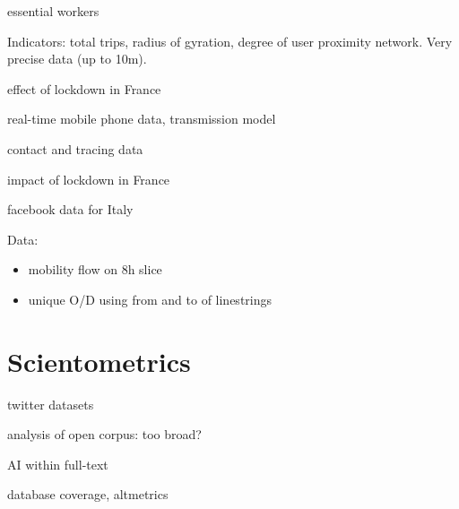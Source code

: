 \documentclass[10pt]{article}
\begin{document}
\cite{batty2020london} essential workers

	
\cite{Pepe2020.03.22.20039933} Indicators: total trips, radius of gyration, degree of user proximity network. Very precise data (up to 10m).

\cite{pullano2020population} effect of lockdown in France



\cite{jia2020population} real-time mobile phone data, transmission model

\cite{Zhangeabb8001} contact and tracing data


\cite{salje:pasteur-02548181} impact of lockdown in France


\cite{Bonaccorsi15530} facebook data for Italy
	
\cite{kissler2020reductions}
	
Data:

\begin{itemize}
	\item mobility flow on 8h slice
	\item unique O/D using from and to of linestrings
\end{itemize}





\section{Scientometrics}

\cite{inuwadutse2020curated} twitter datasets

\cite{Colavizza2020.04.20.046144} analysis of open corpus: too broad?

\cite{khamsi2020coronavirus} AI within full-text

\cite{2020arXiv200410400K} database coverage, altmetrics

	
	
	
	


	
	
\end{document}
